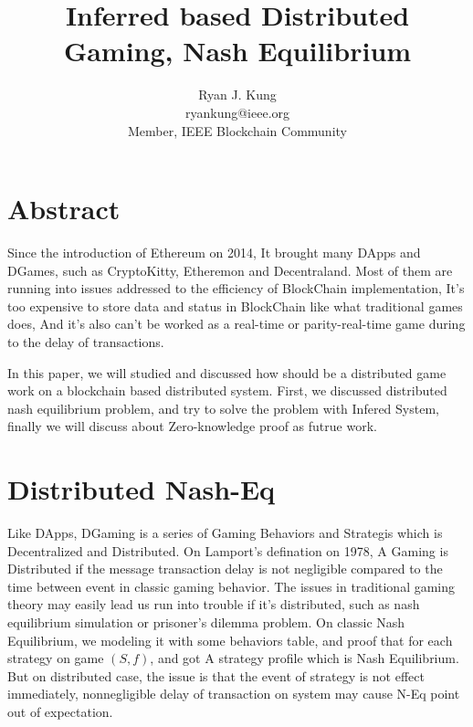\documentclass[twocolumn]{article}
\author{Ryan J. Kung \\ryankung@ieee.org\\Member, IEEE Blockchain Community }
\title{Inferred based Distributed Gaming, Nash Equilibrium}
\begin{document}
\maketitle
\section{Abstract}

Since the introduction of Ethereum on 2014\cite{ethereum}, It brought many DApps and DGames, such as CryptoKitty, Etheremon and Decentraland. Most of them are running into issues addressed to the efficiency of BlockChain implementation, It's too expensive to store data and status in BlockChain like what traditional games does, And it's also can't be worked as a real-time or parity-real-time game during to the delay of transactions. \cite{mrx05}

In this paper, we will studied and discussed how should be a distributed game work on a blockchain based distributed system. First, we discussed distributed nash equilibrium problem, and try to solve the problem with Infered System, finally we will discuss about Zero-knowledge proof as futrue work.

\section{Distributed Nash-Eq}

Like DApps, DGaming is a series of Gaming Behaviors and Strategis which is Decentralized and Distributed. On Lamport's defination on 1978\cite{time-clocks-ordering-events-distributed-system}, A Gaming is Distributed if the message transaction delay is not negligible compared to the time between event in classic gaming behavior. The issues in traditional gaming theory may easily lead us run into trouble if it's distributed, such as nash equilibrium simulation or prisoner's dilemma problem.
On classic Nash Equilibrium, we modeling it with some behaviors table, and proof that for each strategy on game $(S, f)$, and got A strategy profile which is Nash Equilibrium. But on distributed case, the issue is that the event of strategy is not effect immediately, nonnegligible delay of transaction on system may cause N-Eq point out of expectation.
\end{document}
